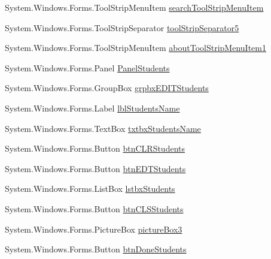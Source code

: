 \begin{DoxyCompactItemize}
\item 
\-System.\-Windows.\-Forms.\-Tool\-Strip\-Menu\-Item \hyperlink{class_sr_p___classroom_inq_1_1frm_classrrom_inq_aa54fbd91dddb42716ec00341ee7ac713}{search\-Tool\-Strip\-Menu\-Item}
\item 
\-System.\-Windows.\-Forms.\-Tool\-Strip\-Separator \hyperlink{class_sr_p___classroom_inq_1_1frm_classrrom_inq_ae8424b2612bda51525d313c05df65bb0}{tool\-Strip\-Separator5}
\item 
\-System.\-Windows.\-Forms.\-Tool\-Strip\-Menu\-Item \hyperlink{class_sr_p___classroom_inq_1_1frm_classrrom_inq_ab34838f16ac4c613949fc6e6b18e972d}{about\-Tool\-Strip\-Menu\-Item1}
\item 
\-System.\-Windows.\-Forms.\-Panel \hyperlink{class_sr_p___classroom_inq_1_1frm_classrrom_inq_a70fa7dcce9d5cbc3564066532704c216}{\-Panel\-Students}
\item 
\-System.\-Windows.\-Forms.\-Group\-Box \hyperlink{class_sr_p___classroom_inq_1_1frm_classrrom_inq_a934cec75a0d91eca5ca9786b078462a3}{grpbx\-E\-D\-I\-T\-Students}
\item 
\-System.\-Windows.\-Forms.\-Label \hyperlink{class_sr_p___classroom_inq_1_1frm_classrrom_inq_ac87221e35b87aece56933aba4e90d11e}{lbl\-Students\-Name}
\item 
\-System.\-Windows.\-Forms.\-Text\-Box \hyperlink{class_sr_p___classroom_inq_1_1frm_classrrom_inq_ad797f7d682d2f40b509b4904fac76461}{txtbx\-Students\-Name}
\item 
\-System.\-Windows.\-Forms.\-Button \hyperlink{class_sr_p___classroom_inq_1_1frm_classrrom_inq_ad2bdef2e6f826a27d003c1a0df8bd2be}{btn\-C\-L\-R\-Students}
\item 
\-System.\-Windows.\-Forms.\-Button \hyperlink{class_sr_p___classroom_inq_1_1frm_classrrom_inq_a527ceba70a2003fe9550f3fb3e307999}{btn\-E\-D\-T\-Students}
\item 
\-System.\-Windows.\-Forms.\-List\-Box \hyperlink{class_sr_p___classroom_inq_1_1frm_classrrom_inq_a0c67f5e900e579981b753ac9853a5141}{lstbx\-Students}
\item 
\-System.\-Windows.\-Forms.\-Button \hyperlink{class_sr_p___classroom_inq_1_1frm_classrrom_inq_a0aed8d1ecf711f52b3a948fdeae6ac5b}{btn\-C\-L\-S\-Students}
\item 
\-System.\-Windows.\-Forms.\-Picture\-Box \hyperlink{class_sr_p___classroom_inq_1_1frm_classrrom_inq_a1320c0263001c5045f415d68935ae50e}{picture\-Box3}
\item 
\-System.\-Windows.\-Forms.\-Button \hyperlink{class_sr_p___classroom_inq_1_1frm_classrrom_inq_a9225d189a561ae3a5b9f68ca3c004351}{btn\-Done\-Students}

\end{DoxyCompactItemize}
